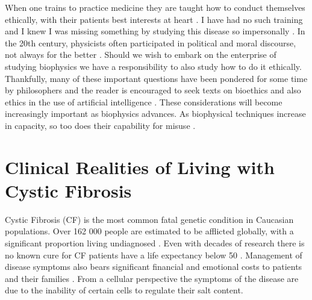 When one trains to practice medicine they are taught how to conduct themselves ethically, with their patients best interests at heart \cite{hajar2017}. I have had no such training and I knew I was missing something by studying this disease so impersonally \cite{foucault1994}. In the 20th century, physicists often participated in political and moral discourse, not always for the better \cite{frank1993, gottfried1999, global2009, rhodes1986, aaronson2008, berger2016, vonneumann_britanica}. Should we wish to embark on the enterprise of studying biophysics we have a responsibility to also study how to do it ethically. Thankfully, many of these important questions have been pondered for some time by philosophers and the reader is encouraged to seek texts on bioethics and also ethics in the use of artificial intelligence \cite{buchanan2000, taneri2011, genome_editting_guildelines_2017, muller2021, bostrom2014}. These considerations will become increasingly important as biophysics advances. As biophysical techniques increase in capacity, so too does their capability for misuse \cite{mallapaty2022, urbina2022}. 





\section{Clinical Realities of Living with Cystic Fibrosis}
Cystic Fibrosis (CF) is the most common fatal genetic condition in Caucasian populations. Over 162 000 people are estimated to be afflicted globally, with a significant proportion living undiagnosed \cite{hammoudeh2021,guo2022}. Even with decades of research there is no known cure for CF patients have a life expectancy below 50 \cite{mcbennett2022}. Management of disease symptoms also bears significant financial and emotional costs to patients and their families \cite{vangool2013, page2022}. From a cellular perspective the symptoms of the disease are due to the inability of certain cells to regulate their salt content. 

